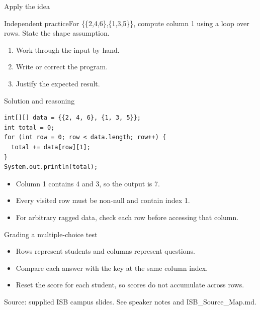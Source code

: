 \documentclass[10pt,aspectratio=169]{beamer}
\begin{document}
\begin{frame}[fragile,t]{Apply the idea}
\begin{alertblock}{Independent practice}For \{\{2,4,6\},\{1,3,5\}\}, compute column 1 using a loop over rows. State the shape assumption.\end{alertblock}\vspace{3mm}\begin{enumerate}\item Work through the input by hand.\item Write or correct the program.\item Justify the expected result.\end{enumerate}
\end{frame}

\begin{frame}[fragile,t]{Solution and reasoning}
\begin{lstlisting}
int[][] data = {{2, 4, 6}, {1, 3, 5}};
int total = 0;
for (int row = 0; row < data.length; row++) {
  total += data[row][1];
}
System.out.println(total);
\end{lstlisting}\vspace{1mm}\small\begin{itemize}
\item Column 1 contains 4 and 3, so the output is 7.
\item Every visited row must be non-null and contain index 1.
\item For arbitrary ragged data, check each row before accessing that column.
\end{itemize}
\end{frame}

\begin{frame}[fragile,t]{Grading a multiple{-}choice test}
\begin{itemize}
\item Rows represent students and columns represent questions.
\item Compare each answer with the key at the same column index.
\item Reset the score for each student, so scores do not accumulate across rows.
\end{itemize}
\vspace{3mm}\footnotesize\textcolor{accent}{Source: supplied ISB campus slides. See speaker notes and ISB\_Source\_Map.md.}
\end{frame}
\end{document}

